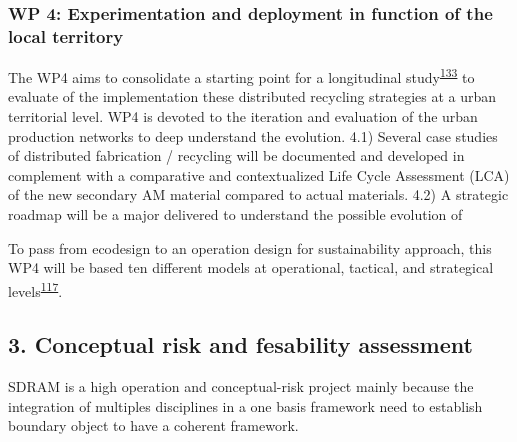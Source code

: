 \documentclass[
  11pt,
  a4paperpaper,
  onecolumn]{article}
\begin{document}
\hypertarget{wp-4-experimentation-and-deployment-in-function-of-the-local-territory}{%
\subsubsection{WP 4: Experimentation and deployment in function of the
local
territory}\label{wp-4-experimentation-and-deployment-in-function-of-the-local-territory}}

The WP4 aims to consolidate a starting point for a longitudinal
study\textsuperscript{\protect\hyperlink{ref-langley2013}{133}} to
evaluate of the implementation these distributed recycling strategies at
a urban territorial level. WP4 is devoted to the iteration and
evaluation of the urban production networks to deep understand the
evolution. 4.1) Several case studies of distributed fabrication /
recycling will be documented and developed in complement with a
comparative and contextualized Life Cycle Assessment (LCA) of the new
secondary AM material compared to actual materials. 4.2) A strategic
roadmap will be a major delivered to understand the possible evolution
of

To pass from ecodesign to an operation design for sustainability
approach, this WP4 will be based ten different models at operational,
tactical, and strategical
levels\textsuperscript{\protect\hyperlink{ref-SousaRocha2019}{117}}.

\hypertarget{conceptual-risk-and-fesability-assessment}{%
\subsection{3. Conceptual risk and fesability
assessment}\label{conceptual-risk-and-fesability-assessment}}

SDRAM is a high operation and conceptual-risk project mainly because the
integration of multiples disciplines in a one basis framework need to
establish boundary object to have a coherent framework.

\small
\end{document}
